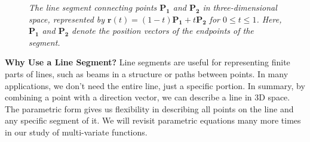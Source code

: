 \begin{figure}[H]
    \centering

    \caption{\textit{The line segment connecting points \( \mathbf{P_1} \) and \( \mathbf{P_2} \) in three-dimensional space, represented by \( \mathbf{r}(t) = (1 - t) \mathbf{P_1} + t \mathbf{P_2} \) for \( 0 \leq t \leq 1 \). Here, \( \mathbf{P_1} \) and \( \mathbf{P_2} \) denote the position vectors of the endpoints of the segment.}}
    \label{fig:line_segment}
\end{figure}




\noindent \textbf{Why Use a Line Segment?} Line segments are useful for representing finite parts of lines, such as beams in a structure or paths between points. In many applications, we don’t need the entire line, just a specific portion. In summary, by combining a point with a direction vector, we can describe a line in 3D space. The parametric form gives us flexibility in describing all points on the line and any specific segment of it. We will revisit parametric equations many more times in our study of multi-variate functions.

